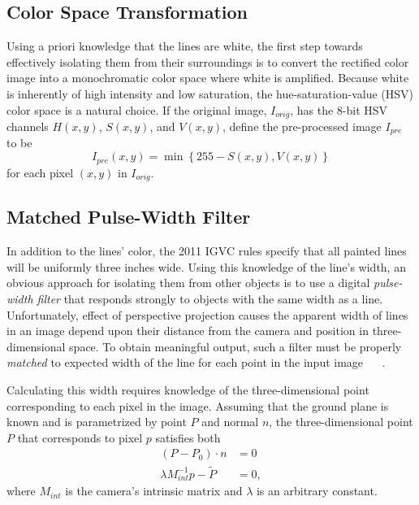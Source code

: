 \documentclass[twocolumn,11pt]{article}
\begin{document}
\subsection{Color Space Transformation}
\label{sec:line-color}
Using a priori knowledge that the lines are white, the first step towards
effectively isolating them from their surroundings is to convert the rectified
color image into a monochromatic color space where white is amplified. Because
white is inherently of high intensity and low saturation, the
hue-saturation-value (HSV) color space is a natural choice. If the original
image, $I_{orig}$, has the 8-bit HSV channels $H(x,y)$, $S(x, y)$, and $V(x,
y)$, define the pre-processed image $I_{pre}$ to be
\begin{equation*}
	I_{pre}(x, y) = \min\left\{255 - S(x, y), V(x, y)\right\}
\end{equation*}
for each pixel $(x, y)$ in $I_{orig}$.

\subsection{Matched Pulse-Width Filter}
\label{sec:line-filter}
In addition to the lines' color, the 2011 IGVC rules specify that all painted
lines will be uniformly three inches wide. Using this knowledge of the line's
width, an  obvious approach for isolating them from other objects is to use a
digital \textit{pulse-width filter} that responds strongly to objects with the
same width as a line. Unfortunately, effect of perspective projection causes
the apparent width of lines in an image depend upon their distance from the
camera and position in three-dimensional space. To obtain meaningful output,
such a filter must be properly \textit{matched} to expected width of the line
for each point in the input image ~\cite{huang_thesis} ~\cite{huang_paper}.

Calculating this width requires knowledge of the three-dimensional point
corresponding to each pixel in the image. Assuming that the ground plane is
known and is parametrized by point $P$ and normal $n$, the three-dimensional
point $P$ that corresponds to pixel $p$ satisfies both
\begin{align*}
	(P - P_0) \cdot n                  &= 0 \\
	\lambda M^{-1}_{int} p - \tilde{P} &= 0,
\end{align*}
where $M_{int}$ is the camera's intrinsic matrix and $\lambda$ is an arbitrary
constant.
\end{document}
